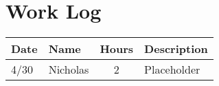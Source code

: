 \documentclass[letterpaper,10pt,fleqn,draftclsnofoot,onecolumn]{IEEEtran}
\begin{document}
	
	\section*{Work Log}
	\begin{tabular}{l l c p{1.1in}}\textbf{Date} & \textbf{Name} & \textbf{Hours} & \textbf{Description}\\\hline
		4/30 & Nicholas & 2 & Placeholder\\\hline
	\end{tabular}
		
		\nocite{*}
		
		
	
\end{document}
